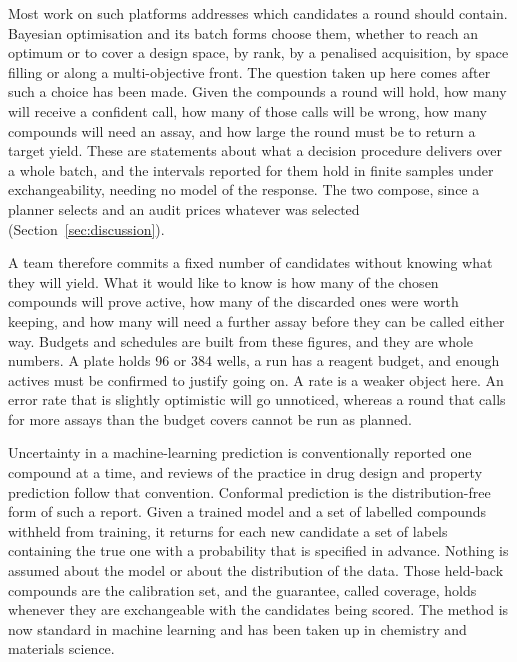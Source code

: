 \documentclass[twocolumn,10pt]{article}
\begin{document}
Most work on such platforms addresses which candidates a round should contain. Bayesian
optimisation and its batch forms choose them, whether to reach an optimum or to cover a design
space, by rank, by a penalised acquisition, by space filling or along a multi-objective
front.\citep{Gonzalez2016LP,HernandezLobato2017TS,Shields2021EDBO,Joseph2016SFD,Kusne2020CAMEO,Eriksson2019TuRBO,Daulton2020qEHVI}
The question taken up here comes after such a choice has been made. Given the compounds a round
will hold, how many will receive a confident call, how many of those calls will be wrong, how
many compounds will need an assay, and how large the round must be to return a target yield.
These are statements about what a decision procedure delivers over a whole batch, and the
intervals reported for them hold in finite samples under exchangeability, needing no model of
the response. The two compose, since a planner selects and an audit prices whatever was
selected (Section~\ref{sec:discussion}).

A team therefore commits a fixed number of candidates without knowing what they will yield. What
it would like to know is how many of the chosen compounds will prove active, how many of the
discarded ones were worth keeping, and how many will need a further assay before they can be
called either way. Budgets and schedules are built from these figures, and they are whole numbers. A plate holds 96 or 384 wells, a run has a reagent budget, and enough actives must be confirmed to justify going on. A rate is a weaker
object here. An error rate that is slightly optimistic will go unnoticed, whereas a round that calls for more assays than the budget covers cannot be run as planned.

Uncertainty in a machine-learning prediction is conventionally reported one compound at a time,
and reviews of the practice in drug design and property prediction follow that
convention.\citep{Mervin2021UQ} Conformal prediction is the distribution-free form of such a
report. Given a trained model and a set of labelled compounds withheld from training, it returns for each new candidate a set of labels containing the true one with a probability that is specified in advance. Nothing is assumed about the model or about the distribution of the data.\citep{vovk2005algorithmic,AngelopoulosBates2023Gentle} Those held-back compounds are the calibration set, and the guarantee, called coverage, holds whenever they are exchangeable with
the candidates being scored. The method is now standard in machine learning and has been taken
up in chemistry and materials
science.\citep{Norinder2014,CortesCiriano2019,Laghuvarapu2023CoDrug}
\end{document}
